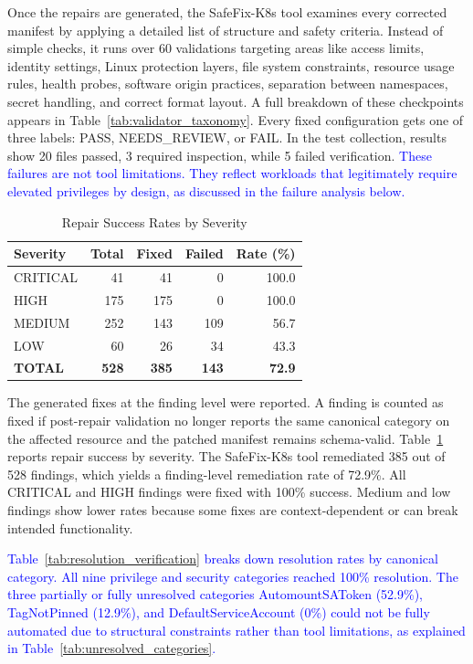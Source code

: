 \documentclass[preprint,12pt]{elsarticle}
\newcommand{\new}[1]{\textcolor{blue}{#1}}
\begin{document}
Once the repairs are generated, the SafeFix-K8s tool examines every corrected manifest by applying a detailed list of structure and safety criteria. Instead of simple checks, it runs over 60 validations targeting areas like access limits, identity settings, Linux protection layers, file system constraints, resource usage rules, health probes, software origin practices, separation between namespaces, secret handling, and correct format layout. A full breakdown of these checkpoints appears in Table~\ref{tab:validator_taxonomy}. Every fixed configuration gets one of three labels: PASS, NEEDS\_REVIEW, or FAIL. In the test collection, results show 20 files passed, 3 required inspection, while 5 failed verification. \new{These failures are not tool limitations. They reflect workloads that legitimately require elevated privileges by design, as discussed in the failure analysis below.}
\begin{table}[]
\centering
\caption{Repair Success Rates by Severity}
\label{tab:repair_by_severity}
\small
\setlength{\tabcolsep}{5pt}
\renewcommand{\arraystretch}{1.1}
\begin{tabular}{lrrrr}
\hline
\textbf{Severity} & \textbf{Total} & \textbf{Fixed} & \textbf{Failed} & \textbf{Rate (\%)} \\
\hline
CRITICAL & 41 & 41 & 0 & 100.0 \\
HIGH & 175 & 175 & 0 & 100.0 \\
MEDIUM & 252 & 143 & 109 & 56.7 \\
LOW & 60 & 26 & 34 & 43.3 \\
\hline
\textbf{TOTAL} & \textbf{528} & \textbf{385} & \textbf{143} & \textbf{72.9} \\
\hline
\end{tabular}
\end{table}

The generated fixes at the finding level were reported. A finding is counted as fixed if post-repair validation no longer reports the same canonical category on the affected resource and the patched manifest remains schema-valid. Table~\ref{tab:repair_by_severity} reports repair success by severity. The SafeFix-K8s tool remediated 385 out of 528 findings, which yields a finding-level remediation rate of 72.9\%. All CRITICAL and HIGH findings were fixed with 100\% success. Medium and low findings show lower rates because some fixes are context-dependent or can break intended functionality.


\new{Table~\ref{tab:resolution_verification} breaks down resolution rates by canonical category. All nine privilege and security categories reached 100\% resolution. The three partially or fully unresolved categories AutomountSAToken (52.9\%), TagNotPinned (12.9\%), and DefaultServiceAccount (0\%) could not be fully automated due to structural constraints rather than tool limitations, as explained in Table~\ref{tab:unresolved_categories}.}
\end{document}
